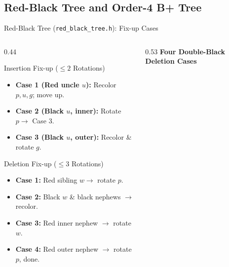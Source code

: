 \documentclass[aspectratio=169, 10pt, xcolor={x11names}]{beamer}
\begin{document}
\subsection{Red-Black Tree and Order-4 B+ Tree}
\begin{frame}{Red-Black Tree (\texttt{red\_black\_tree.h}): Fix-up Cases}
\begin{columns}[c,onlytextwidth]
\begin{column}{0.44\textwidth}
\begin{block}{\footnotesize Insertion Fix-up ($\le 2$ Rotations)}
\footnotesize
\begin{itemize}\setlength{\itemsep}{0.3em}
  \item \textbf{Case 1 (Red uncle $u$):} Recolor $p, u, g$; move up.
  \item \textbf{Case 2 (Black $u$, inner):} Rotate $p \to$ Case 3.
  \item \textbf{Case 3 (Black $u$, outer):} Recolor \& rotate $g$.
\end{itemize}
\end{block}

\vspace{0.2em}
\begin{alertblock}{\footnotesize Deletion Fix-up ($\le 3$ Rotations)}
\footnotesize
\begin{itemize}\setlength{\itemsep}{0.3em}
  \item \textbf{Case 1:} Red sibling $w \to$ rotate $p$.
  \item \textbf{Case 2:} Black $w$ \& black nephews $\to$ recolor.
  \item \textbf{Case 3:} Red inner nephew $\to$ rotate $w$.
  \item \textbf{Case 4:} Red outer nephew $\to$ rotate $p$, done.
\end{itemize}
\end{alertblock}
\end{column}

\begin{column}{0.53\textwidth}
\centering
\scriptsize\textbf{\color{primary}Four Double-Black Deletion Cases}\\[0.3em]
\end{column}
\end{columns}
\end{frame}
\end{document}
